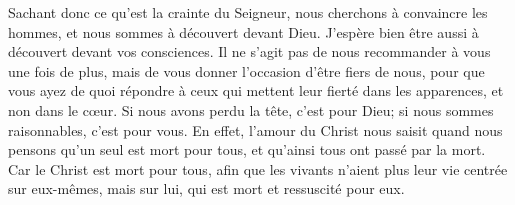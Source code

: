 Sachant donc ce qu’est la crainte du Seigneur,
	nous cherchons à convaincre les hommes,
	et nous sommes à découvert devant Dieu.
	J’espère bien être aussi à découvert devant vos consciences.
Il ne s’agit pas de nous recommander à vous une fois de plus,
	mais de vous donner l’occasion d’être fiers de nous,
	pour que vous ayez de quoi répondre
		à ceux qui mettent leur fierté dans les apparences, et non dans le cœur.
Si nous avons perdu la tête, c’est pour Dieu;
	si nous sommes raisonnables, c’est pour vous.
En effet, l’amour du Christ nous saisit
		quand nous pensons qu’un seul est mort pour tous,
	et qu’ainsi tous ont passé par la mort.
Car le Christ est mort pour tous,
	afin que les vivants n’aient plus leur vie centrée sur eux-mêmes,
	mais sur lui, qui est mort et ressuscité pour eux.
